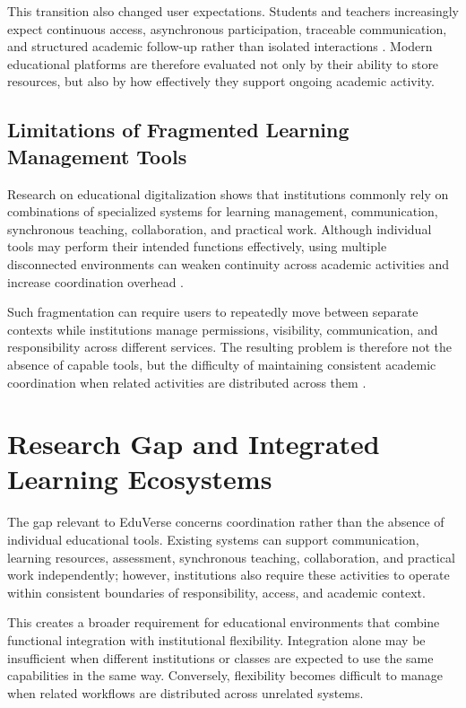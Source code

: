 This transition also changed user expectations. Students and teachers
increasingly expect continuous access, asynchronous participation, traceable
communication, and structured academic follow-up rather than isolated
interactions \cite{chugh2023edtech}. Modern educational platforms are therefore
evaluated not only by their ability to store resources, but also by how
effectively they support ongoing academic activity.

\subsection{Limitations of Fragmented Learning Management Tools}
\label{subsec:limitations_of_fragmented_learning_management_tools}

Research on educational digitalization shows that institutions commonly rely
on combinations of specialized systems for learning management, communication,
synchronous teaching, collaboration, and practical work. Although individual
tools may perform their intended functions effectively, using multiple
disconnected environments can weaken continuity across academic activities and
increase coordination overhead \cite{bygstad2022digital,oecd2023outlook}.

Such fragmentation can require users to repeatedly move between separate
contexts while institutions manage permissions, visibility, communication, and
responsibility across different services. The resulting problem is therefore
not the absence of capable tools, but the difficulty of maintaining consistent
academic coordination when related activities are distributed across them
\cite{bygstad2022digital,oecd2023outlook}.

\section{Research Gap and Integrated Learning Ecosystems}
\label{sec:research_gap_integrated_ecosystem}

The gap relevant to EduVerse concerns coordination rather than the absence of
individual educational tools. Existing systems can support communication,
learning resources, assessment, synchronous teaching, collaboration, and
practical work independently; however, institutions also require these
activities to operate within consistent boundaries of responsibility, access,
and academic context.

This creates a broader requirement for educational environments that combine
functional integration with institutional flexibility. Integration alone may be insufficient when different institutions or classes are expected to use the same capabilities in the same way. Conversely, flexibility becomes difficult to
manage when related workflows are distributed across unrelated systems.

